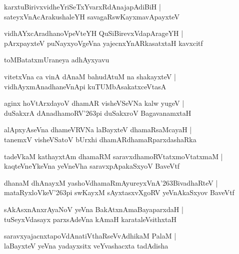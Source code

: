 \documentclass[twoside,12pt,openright]{book}
\def\S{\char'263}
\newcounter{shloka}[chapter]
\begin{document}
\begin{shloka}%
karxtuBirivxvidheYriSeTxYvarxRdAnajapAdiBiH |\\
sateyxVnAcArakushaleYH savagaRswKayxmavApayxteV 
\end{shloka}

\begin{shloka}%
vidhAYxcAradhanoVpeVteYH QuSiBirevxVdapArageYH |\\
pArxpayxteV puNayxyoVgeVna yajecnxYnARkasatxtaH kavxcitf
\end{shloka}

\begin{center}
toMBatatxmUraneya adhAyxyavu
\end{center}

\begin{shloka}%
vitetxVna ca vinA dAnaM bahudAtuM na shakayxteV |\\
vidhAyxmAnadhaneVnApi kuTUMbAsakatxceVtasA 
\end{shloka}

\begin{shloka}%
aginx hoVtArxdayoV dhamAR visheVSeVNa kalw yugeV |\\
duSakxrA dAnadhamoRV\S pi duSakxroV BagavanamxtaH 
\end{shloka}

\begin{shloka}%
alApxyAseVna dhameVRVNa laBayxteV dhamaRsaMcayaH |\\
tanemxV visheVSatoV bUrxhi dhamARdhamaRparxdashaRka
\end{shloka}

\begin{shloka}%
tadeVkaM kathayxtAm dhamaRM saravxdhamoRVtatxmoVtatxmaM |\\
kaqteVneYkeVna yeVneVha saravxpApakaSxyoV BaveVtf
\end{shloka}

\begin{shloka}%
dhanaM dhAnayxM yashoVdhamaRmAyureyxVnA\S BivadhaRteV |\\
mataRyxloVkeV\S pi swKayxM sAyxtasxvXgoRV yeVnAkaSxyov BaveVtf
\end{shloka}

\begin{shloka}%
sAkAsxnAnxrAyaNoV yeVna BakAtxnAmaBayaparxdaH |\\
tuSeyxVdasayx parxsAdeVna kAmaH karataleVsithxtaH 
\end{shloka}

\begin{shloka}%
saravxyajacnxtapoVdAnatiVthaRseVvAdhikaM PalaM |\\
laBayxteV yeVna yadayxsitx veYvashacxta tadAdisha
\end{shloka}
\end{document}
